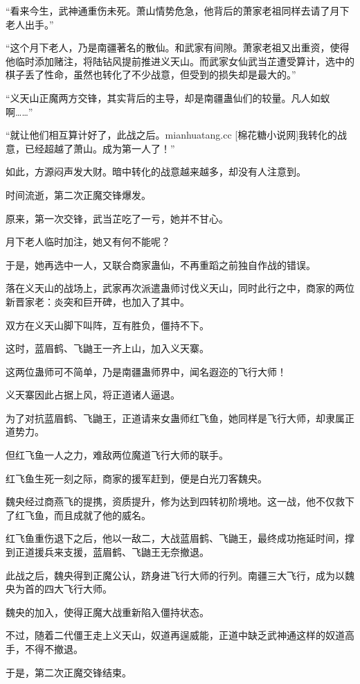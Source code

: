 \begin{this_body}
“看来今生，武神通重伤未死。萧山情势危急，他背后的萧家老祖同样去请了月下老人出手。”

“这个月下老人，乃是南疆著名的散仙。和武家有间隙。萧家老祖又出重资，使得他临时添加赌注，将陆钻风提前推进义天山。而武家女仙武当芷遭受算计，选中的棋子丢了性命，虽然也转化了不少战意，但受到的损失却是最大的。”

“义天山正魔两方交锋，其实背后的主导，却是南疆蛊仙们的较量。凡人如蚁啊……”

“就让他们相互算计好了，此战之后。mianhuatang.cc [棉花糖小说网]我转化的战意，已经超越了萧山。成为第一人了！”

如此，方源闷声发大财。暗中转化的战意越来越多，却没有人注意到。

时间流逝，第二次正魔交锋爆发。

原来，第一次交锋，武当芷吃了一亏，她并不甘心。

月下老人临时加注，她又有何不能呢？

于是，她再选中一人，又联合商家蛊仙，不再重蹈之前独自作战的错误。

落在义天山的战场上，武家再次派遣蛊师讨伐义天山，同时此行之中，商家的两位新晋家老：炎突和巨开碑，也加入了其中。

双方在义天山脚下叫阵，互有胜负，僵持不下。

这时，蓝眉鹤、飞鼬王一齐上山，加入义天寨。

这两位蛊师可不简单，乃是南疆蛊师界中，闻名遐迩的飞行大师！

义天寨因此占据上风，将正道诸人逼退。

为了对抗蓝眉鹤、飞鼬王，正道请来女蛊师红飞鱼，她同样是飞行大师，却隶属正道势力。

但红飞鱼一人之力，难敌两位魔道飞行大师的联手。

红飞鱼生死一刻之际，商家的援军赶到，便是白光刀客魏央。

魏央经过商燕飞的提携，资质提升，修为达到四转初阶境地。这一战，他不仅救下了红飞鱼，而且成就了他的威名。

红飞鱼重伤退下之后，他以一敌二，大战蓝眉鹤、飞鼬王，最终成功拖延时间，撑到正道援兵来支援，蓝眉鹤、飞鼬王无奈撤退。

此战之后，魏央得到正魔公认，跻身进飞行大师的行列。南疆三大飞行，成为以魏央为首的四大飞行大师。

魏央的加入，使得正魔大战重新陷入僵持状态。

不过，随着二代僵王走上义天山，奴道再逞威能，正道中缺乏武神通这样的奴道高手，不得不撤退。

于是，第二次正魔交锋结束。


\end{this_body}
